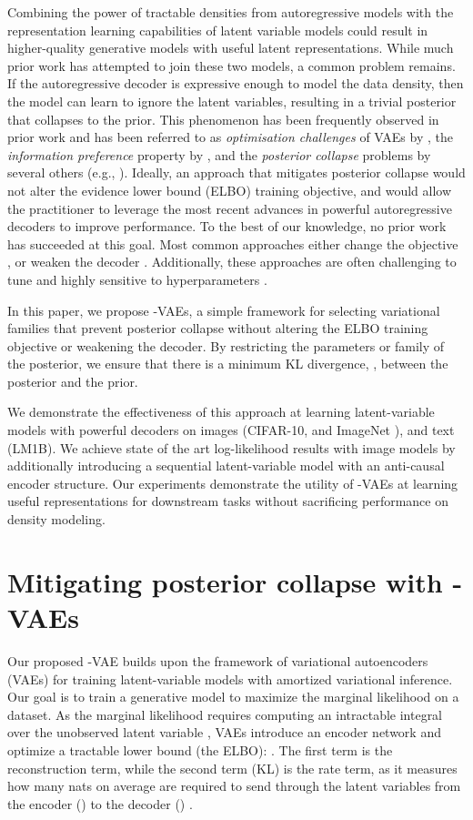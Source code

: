 \documentclass{article} \usepackage{iclr2019_conference,times}
\begin{document}
Combining the power of tractable densities from autoregressive models with the representation learning capabilities of latent variable models could result in higher-quality generative models with useful latent representations. While much prior work has attempted to join these two models, a common problem remains. If the autoregressive decoder is expressive enough to model the data density, then the model can learn to ignore the latent variables, resulting in a trivial posterior that collapses to the prior. 
This phenomenon has been frequently observed in prior work and has been referred to as 
\textit{optimisation challenges} of VAEs by \citet{Bowman2015}, 
the \textit{information preference} property by \citet{VLAE}, and the \textit{posterior collapse} problems by several others (e.g., \citet{VQVAE, SAVAE}). 
Ideally, an approach that mitigates posterior collapse would not alter the evidence lower bound (ELBO) training objective, and would allow the practitioner to leverage the most recent advances in powerful autoregressive decoders to improve performance. To the best of our knowledge, no prior work has succeeded at this goal. Most common approaches either change the objective \citep{betavae, Alemi2017, InfoVAE, VLAE, agave}, or weaken the decoder \citep{Bowman2015, PixelVAE}. Additionally, these approaches are often challenging to tune and highly sensitive to hyperparameters \citep{Alemi2017, VLAE}.

In this paper, we propose -VAEs, a simple framework for selecting variational families that prevent posterior collapse without altering the ELBO training objective or weakening the decoder. By restricting the parameters or family of the posterior, we ensure that there is a minimum KL divergence, , between the posterior and the prior.

We demonstrate the effectiveness of this approach at learning latent-variable models with powerful decoders on images (CIFAR-10, and ImageNet ), and text (LM1B). We achieve state of the art log-likelihood results with image models by additionally introducing a sequential latent-variable model with an anti-causal encoder structure. Our experiments demonstrate the utility of -VAEs at learning useful representations for downstream tasks without sacrificing performance on density modeling.
 \section{Mitigating posterior collapse with -VAEs}
Our proposed -VAE builds upon the framework of variational autoencoders (VAEs) \citep{VAE, Rezende2014} for training latent-variable models with amortized variational inference. Our goal is to train a generative model  to maximize the marginal likelihood  on a dataset. As the marginal likelihood requires computing an intractable integral over the unobserved latent variable , VAEs introduce an encoder network  and optimize a tractable lower bound (the ELBO): . The first term is the reconstruction term, while the second term (KL) is the rate term, as it measures how many nats on average are required to send through the latent variables from the encoder () to the decoder () \citep{Hoffman2016, Alemi2017}.
\end{document}
